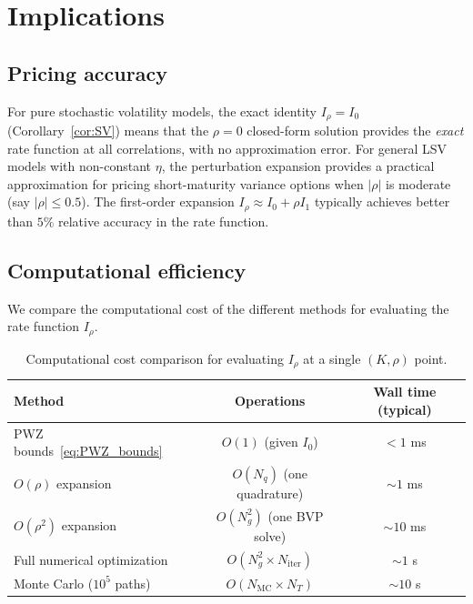 \documentclass[11pt]{article}
\theoremstyle{definition}
\begin{document}
\section{Implications}\label{sec:implications}

\subsection{Pricing accuracy}

For pure stochastic volatility models, the exact identity $I_\rho = I_0$ (Corollary~\ref{cor:SV}) means that the $\rho = 0$ closed-form solution provides the \emph{exact} rate function at all correlations, with no approximation error. For general LSV models with non-constant $\eta$, the perturbation expansion provides a practical approximation for pricing short-maturity variance options when $|\rho|$ is moderate (say $|\rho| \leq 0.5$). The first-order expansion $I_\rho \approx I_0 + \rho I_1$ typically achieves better than $5\%$ relative accuracy in the rate function.

\subsection{Computational efficiency}

We compare the computational cost of the different methods for evaluating the rate function $I_\rho$.

\begin{table}[h]
\centering
\caption{Computational cost comparison for evaluating $I_\rho$ at a single $(K, \rho)$ point.}\label{tab:cost}
\begin{tabular}{l|cc}
\hline
Method & Operations & Wall time (typical) \\
\hline
PWZ bounds~\eqref{eq:PWZ_bounds} & $O(1)$ (given $I_0$) & $< 1$ ms \\
$O(\rho)$ expansion & $O(N_q)$ (one quadrature) & $\sim 1$ ms \\
$O(\rho^2)$ expansion & $O(N_g^2)$ (one BVP solve) & $\sim 10$ ms \\
Full numerical optimization & $O(N_g^2 \times N_{\mathrm{iter}})$ & $\sim 1$ s \\
Monte Carlo ($10^5$ paths) & $O(N_{\mathrm{MC}} \times N_T)$ & $\sim 10$ s \\
\hline
\end{tabular}
\end{table}
\end{document}

